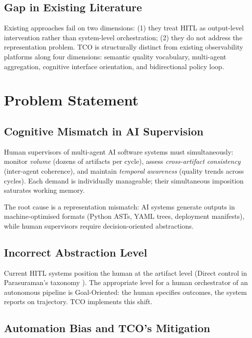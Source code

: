 \documentclass[manuscript,review,anonymous]{acmart}
\begin{document}
\subsection{Gap in Existing Literature}

Existing approaches fail on two dimensions: (1) they treat HITL as output-level
intervention rather than system-level orchestration; (2) they do not address the
representation problem. TCO is structurally distinct from existing observability
platforms along four dimensions: semantic quality vocabulary, multi-agent aggregation,
cognitive interface orientation, and bidirectional policy loop.

\section{Problem Statement}

\subsection{Cognitive Mismatch in AI Supervision}

Human supervisors of multi-agent AI software systems must simultaneously:
monitor \textit{volume} (dozens of artifacts per cycle), assess
\textit{cross-artifact consistency} (inter-agent coherence), and maintain
\textit{temporal awareness} (quality trends across cycles). Each demand is individually
manageable; their simultaneous imposition saturates working memory.

The root cause is a representation mismatch: AI systems generate outputs in
machine-optimised formats (Python ASTs, YAML trees, deployment manifests), while human
supervisors require decision-oriented abstractions.

\subsection{Incorrect Abstraction Level}

Current HITL systems position the human at the artifact level (Direct control in
Parasuraman's taxonomy \cite{parasuraman2000levels}). The appropriate level for a
human orchestrator of an autonomous pipeline is Goal-Oriented: the human specifies
outcomes, the system reports on trajectory. TCO implements this shift.

\subsection{Automation Bias and TCO's Mitigation}
\end{document}
